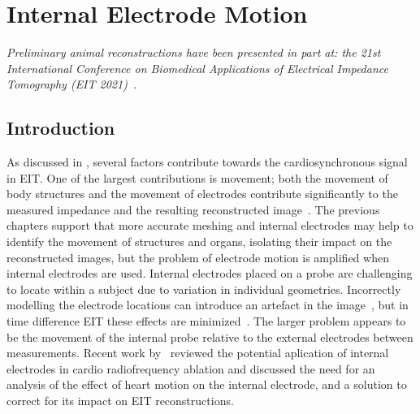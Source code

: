 \chapter{Internal Electrode Motion}
\label{chap:chapter-7}

\emph{Preliminary animal reconstructions have
 been presented in part at: 
 the 21st International Conference on Biomedical 
 Applications of Electrical Impedance Tomography (EIT 2021)~\parencite{stowe_using_2021}.} 

\section{Introduction}
As discussed in , several factors contribute towards
the cardiosynchronous signal in EIT. One of the largest contributions 
is movement; both the movement of 
body structures and the movement of electrodes contribute significantly to the measured
impedance and the resulting reconstructed 
image~\parencite{adler_origins_2017,proenca_influence_2015}.
The previous chapters support that more accurate meshing and internal electrodes may
help to identify the movement of structures and organs, isolating their impact on the 
reconstructed images, but the problem of electrode motion is amplified when internal
electrodes are used. 
Internal electrodes placed on a probe are challenging to locate within a subject
due to variation in individual geometries. Incorrectly modelling the electrode 
locations can introduce an artefact in the image~\parencite{boyle_impact_2011}, 
but in time difference EIT these effects are minimized~\parencite{adler_electrical_2017}. 
The larger problem appears 
to be the 
movement of the internal probe relative to the external electrodes between
measurements. Recent work by~
reviewed the potential aplication of internal electrodes in cardio 
radiofrequency ablation and discussed the need for an analysis 
of the effect of heart motion on the internal electrode, and a solution 
to correct for its impact on EIT reconstructions.

